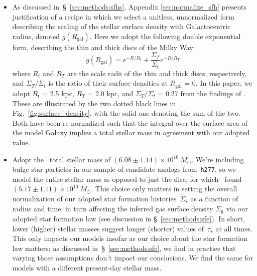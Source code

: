 \documentclass[fleqn, usenatbib]{mnras}
\begin{document}
\begin{itemize} 
	\item As discussed in~\S~\ref{sec:methods:sfhs}, Appendix 
	\ref{sec:normalize_sfh} presents justification of a recipe in which we 
	select a unitless, unnormalized form describing the scaling of the 
	stellar surface density with Galactocentric radius, denoted 
	$g(R_\text{gal})$. Here we adopt the following double exponential form, 
	describing the thin and thick discs of the Milky Way: 
	\begin{equation} 
	g(R_\text{gal}) = e^{-R/R_t} + \frac{\Sigma_T}{\Sigma_t}e^{-R/R_T} 
	\end{equation} 
	where $R_t$ and $R_T$ are the scale radii of the thin and thick discs, 
	respectively, and $\Sigma_T/\Sigma_t$ is the ratio of their surface 
	densities at $R_\text{gal}$ = 0. In this paper, we adopt $R_t$ = 2.5 kpc, 
	$R_T$ = 2.0 kpc, and $\Sigma_T/\Sigma_t$ = 0.27 from the findings of 
	\citet{Bland-Hawthorn2016}. These are illustrated by the two dotted black 
	lines in Fig.~\ref{fig:surface_density}, with the solid one denoting the 
	sum of the two. Both have been re-normalized such that the integral over 
	the surface area of the model Galaxy implies a total stellar mass in 
	agreement with our adopted value. 

	\item Adopt the~\citet{Licquia2015} total stellar mass of 
	$(6.08\pm1.14)\times10^{10}~M_\odot$. We're including bulge star particles 
	in our sample of candidate analogs from~\texttt{h277}, so we model the 
	entire stellar mass as opposed to just the disc, for 
	which~\citet{Licquia2015} found $(5.17\pm1.11)\times10^{10}~M_\odot$. 
	This choice only matters in setting the overall normalization of our 
	adopted star formation histories~$\dot{\Sigma}_\star$ as a function of 
	radius and time, in turn affecting the inferred gas surface density 
	$\Sigma_\text{g}$ via our adopted star formation law (see discussion in 
	\S~\ref{sec:methods:sfe}). In short, lower (higher) stellar masses suggest 
	longer (shorter) values of~$\tau_\star$ at all times. This only impacts our 
	models insofar as our choice about the star formation law matters; as 
	discussed in~\S~\ref{sec:methods:sfe}, we find in practice that varying 
	those assumptions don't impact our conclusions. We find the same for models 
	with a different present-day stellar mass. 


\end{itemize}
\end{document}
